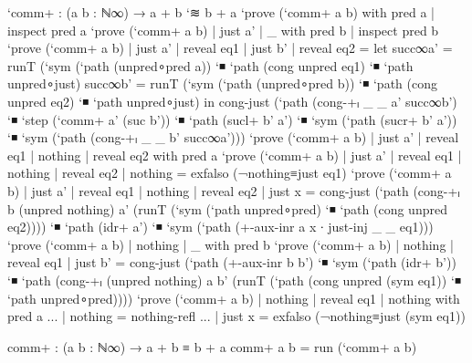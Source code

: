 \begin{code}[hide]
`comm+ : (a b : ℕ∞) → a + b `≋ b + a
`prove (`comm+ a b) with pred a | inspect pred a
`prove (`comm+ a b) | just a' | _ with pred b | inspect pred b
`prove (`comm+ a b) | just a' | reveal eq1 | just b' | reveal eq2 =
  let succ∞a' = runT (`sym (`path (unpred∘pred {a})) `◾ `path (cong unpred eq1) `◾ `path unpred∘just)
      succ∞b' = runT (`sym (`path (unpred∘pred {b})) `◾ `path (cong unpred eq2) `◾ `path unpred∘just)
  in cong-just (`path (cong-+ₗ _ _ a' succ∞b')
 `◾ `step (`comm+ a' (suc b'))
 `◾ `path (sucl+ b' a')
 `◾ `sym (`path (sucr+ b' a'))
 `◾ `sym (`path (cong-+ₗ _ _ b' succ∞a')))
`prove (`comm+ a b) | just a' | reveal eq1 | nothing | reveal eq2 with pred a
`prove (`comm+ a b) | just a' | reveal eq1 | nothing | reveal eq2 | nothing = exfalso (¬nothing≡just eq1)
`prove (`comm+ a b) | just a' | reveal eq1 | nothing | reveal eq2 | just x = cong-just
  (`path (cong-+ₗ b (unpred nothing) a' (runT (`sym (`path unpred∘pred) `◾ `path (cong unpred eq2))))
  `◾ `path (idr+ a')
  `◾ `sym (`path (+-aux-inr a x ∙ just-inj _ _ eq1)))
`prove (`comm+ a b) | nothing | _ with pred b
`prove (`comm+ a b) | nothing | reveal eq1 | just b' = cong-just (`path (+-aux-inr b b')
                                               `◾ `sym (`path (idr+ b'))
                                               `◾ `path (cong-+ₗ (unpred nothing) a b' (runT (`path (cong unpred (sym eq1)) `◾ `path unpred∘pred))))
`prove (`comm+ a b) | nothing | reveal eq1 | nothing with pred a
... | nothing = nothing-refl
... | just x = exfalso (¬nothing≡just (sym eq1))

comm+ : (a b : ℕ∞) → a + b ≡ b + a
comm+ a b = run (`comm+ a b)
\end{code}
